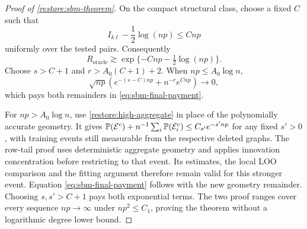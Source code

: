 \begin{proof}[Proof of \cref{restore:sbm-theorem}]
On the compact structural class, choose a fixed $C$ such that
\[
 I_{k\ell}-\frac12\log(np)\le Cnp
\]
uniformly over the tested pairs. Consequently
\[
 R_{\mathrm{oracle}}\gtrsim\exp\{-Cnp-\tfrac12\log(np)\}.
\]
Choose $s>C+1$ and $r>A_0(C+1)+2$. When
$np\le A_0\log n$,
\[
 \sqrt{np}\left(e^{-(s-C)np}+n^{-r}e^{Cnp}\right)\longrightarrow0,
\]
which pays both remainders in \eqref{eq:sbm-final-payment}.

For ${np}>A_0\log n$, use \cref{restore:high-aggregate} in place of
the polynomially accurate geometry. It gives
$\mathbb P(\mathcal E^c)+n^{-1}\sum_i\mathbb P(\mathcal E_i^c)\le C_{s'}e^{-s'{np}}$ for any fixed
$s'>0$, with training events still measurable from the respective
deleted graphs. The row-tail proof uses deterministic aggregate
geometry and applies innovation concentration before restricting
to that event. Its estimates, the local LOO comparison and the
fitting argument therefore remain valid for this stronger event.
Equation \eqref{eq:sbm-final-payment} follows with the new geometry
remainder. Choosing $s,s'>C+1$ pays both exponential terms.
The two proof ranges cover every sequence ${np}\to\infty$ under
$np^2\le C_1$, proving the theorem without a logarithmic degree
lower bound.
\end{proof}
